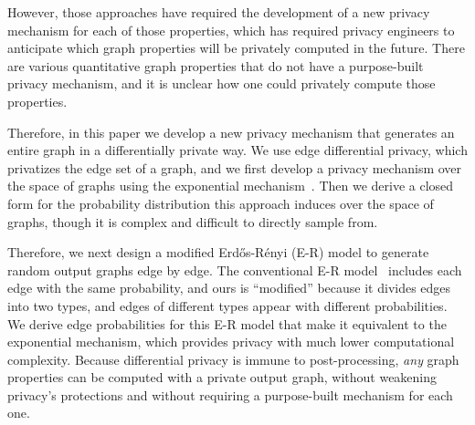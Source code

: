 \documentclass[conference]{ieeeconf}
\newcommand{\ER}{Erd\H{o}s-R\'{e}nyi }
\begin{document}
However, those approaches have required the development of a new privacy mechanism for each of those properties, which
has required privacy engineers to anticipate which graph properties will be privately
computed in the future. 
There are various quantitative graph properties that do not have a purpose-built privacy
mechanism, and it is unclear how one could privately compute those properties. 

Therefore, in this paper we develop a new privacy mechanism that generates an entire graph in a differentially
private way. We use edge differential privacy, which privatizes the edge set of a graph, and
we first develop a privacy mechanism
over the space of graphs using
the exponential mechanism~\cite{mcsherry2007mechanism}. 
Then we derive a closed form for the probability distribution 
this approach induces over the space of graphs, though it is complex
and difficult to  directly sample from. 

Therefore, we next design 
a modified \ER (E-R) model to generate random output graphs edge by edge. 
The conventional E-R model~\cite{erdds1959random} includes each edge with the same probability,
and ours is ``modified'' because it divides edges into two types,  
and edges of different types appear with different probabilities. 
We derive edge probabilities for this E-R model that make it equivalent to the exponential
mechanism, which provides privacy with much lower computational complexity. 
Because differential privacy is immune to post-processing, \emph{any} graph properties
can be computed with a private output graph, without weakening privacy's protections
and without requiring a purpose-built mechanism for each one. 


\end{document}
